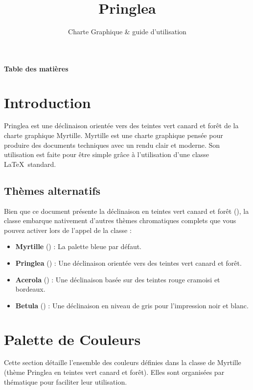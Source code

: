 \documentclass[theme=pringlea]{myrtille}
\title{Pringlea}
\subtitle{Charte Graphique \& guide d'utilisation}
\begin{document}
\makecover

{\sffamily\Large\bfseries\color{dark} Table des matières}\par
\vspace{-15pt} %
\hrulefull
\tableofcontents

\newpage


\section{Introduction}
Pringlea est une déclinaison orientée vers des teintes vert canard et forêt de la charte graphique Myrtille. Myrtille est une charte graphique pensée pour produire des documents techniques avec un rendu clair et moderne. Son utilisation est faite pour être simple grâce à l'utilisation d'une classe \LaTeX\ standard.

\subsection{Thèmes alternatifs}
Bien que ce document présente la déclinaison en teintes vert canard et forêt (), la classe embarque nativement d'autres thèmes chromatiques complets que vous pouvez activer lors de l'appel de la classe :
\begin{itemize}
    \item \textbf{Myrtille} () : La palette bleue par défaut.
    \item \textbf{Pringlea} () : Une déclinaison orientée vers des teintes vert canard et forêt.
    \item \textbf{Acerola} () : Une déclinaison basée sur des teintes rouge cramoisi et bordeaux.
    \item \textbf{Betula} () : Une déclinaison en niveau de gris pour l'impression noir et blanc.
\end{itemize}

\section{Palette de Couleurs}
Cette section détaille l'ensemble des couleurs définies dans la classe de Myrtille (thème Pringlea en teintes vert canard et forêt). Elles sont organisées par thématique pour faciliter leur utilisation.
\end{document}
